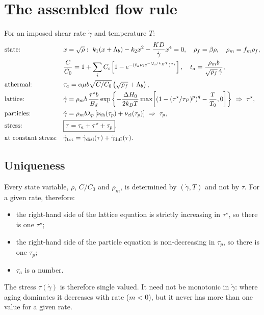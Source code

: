 \documentclass[11pt]{article}
\newcommand{\gd}{\dot\gamma}
\newcommand{\ts}{\tau^{\star}}
\newcommand{\kT}{k_BT}
\numberwithin{equation}{section}
\begin{document}
\section{The assembled flow rule}
\begin{keybox}
For an imposed shear rate $\gd$ and temperature $T$:
\begin{align}
&\text{state:} && x=\sqrt\rho:\ k_1(x+\Lambda_b)-k_2x^2-\frac{K D}{\gd}x^4=0,\quad \rho_f=\beta\rho,\quad \rho_m=f_m\rho_f,\notag\\
&&& \frac{C}{C_0}=1+\sum_iC_i\left[1-e^{-(t_a\nu_ie^{-Q_i/\kT})^{\alpha_i}}\right],\quad t_a=\frac{\rho_mb}{\sqrt{\rho_f}\,\gd},\notag\\
&\text{athermal:} && \tau_a=\alpha\mu b\sqrt{C/C_0}\left(\sqrt{\rho_f}+\Lambda_b\right),\notag\\
&\text{lattice:} && \gd=\rho_mb\,\frac{\ts b}{B_d}\exp\left\{-\frac{\Delta H_0}{2\kT}\max\!\left[\left(1-(\ts/\tau_P)^p\right)^q-\frac{T}{T_0},0\right]\right\}\ \Rightarrow\ \ts,\notag\\
&\text{particles:} && \gd=\rho_mb\lambda_p\left[\nu_{\rm th}(\tau_p)+\nu_{\rm cl}(\tau_p)\right]\ \Rightarrow\ \tau_p,\notag\\
&\text{stress:} && \boxed{\tau=\tau_a+\ts+\tau_p},\notag\\
&\text{at constant stress:} && \gd_{\rm tot}=\gd_{\rm disl}(\tau)+\gd_{\rm diff}(\tau).\notag
\end{align}
\end{keybox}

\subsection{Uniqueness}
Every state variable, $\rho$, $C/C_0$ and $\rho_m$, is determined by $(\gd,T)$ and not by $\tau$. For a given rate, therefore:
\begin{itemize}
\item the right-hand side of the lattice equation is strictly increasing in $\ts$, so there is one $\ts$;
\item the right-hand side of the particle equation is non-decreasing in $\tau_p$, so there is one $\tau_p$;
\item $\tau_a$ is a number.
\end{itemize}
The stress $\tau(\gd)$ is therefore single valued. It need not be monotonic in $\gd$: where aging dominates it decreases with rate ($m<0$), but it never has more than one value for a given rate.
\end{document}
